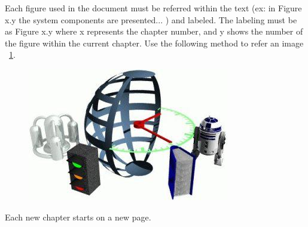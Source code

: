 Each figure used in the document must be referred within the text (ex: in Figure x.y the system components are presented... ) and labeled. The labeling must be as Figure x.y where x represents the chapter number, and y shows the number of the figure within the current chapter. 
Use the following method to refer an image ~\ref{fig:imag}.

\begin{figure}[ht]
	\centering
	\includegraphics[]{figs/test.jpg}
	\caption{}
	\label{fig:imag}
\end{figure}

Each new chapter starts on a new page.

\vspace{10pt}

\lipsum[1-15]
\newpage